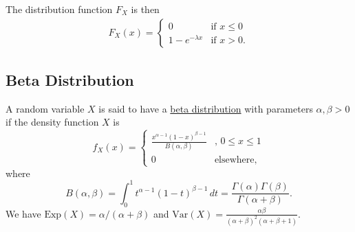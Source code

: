 The distribution function $F_X$ is then
    \begin{align*}
    F_X (x) = \left\{ \begin{matrix} 0 & \text{if } x \leq 0 \\ 1 - e^{-\lambda x} & \text{if } x > 0. \end{matrix} \right. 
    \end{align*}

\subsection*{Beta Distribution}

A random variable $X$ is said to have a \underline{beta distribution} with parameters $\alpha , \beta > 0$ if the density function $X$ is
    \[
        f_X (x) = \left\{ \begin{matrix} \displaystyle \frac{x^{\alpha - 1} (1 - x)^{\beta - 1}}{B (\alpha , \beta )} & \text{, } 0 \leq x \leq 1 \\ 
        0 & \text{elsewhere,} \end{matrix} \right. 
    \]
where
    \[
        B(\alpha , \beta ) = \int_0^1 t^{\alpha - 1} (1 - t)^{\beta - 1} \, dt = \frac{\Gamma (\alpha ) \Gamma (\beta )}{\Gamma (\alpha + \beta ) } .
    \]
We have $\mathrm{Exp} (X) = \alpha / (\alpha + \beta )$ and $\mathrm{Var} (X) = \frac{\alpha \beta}{(\alpha + \beta)^2 (\alpha + \beta + 1)}$.


